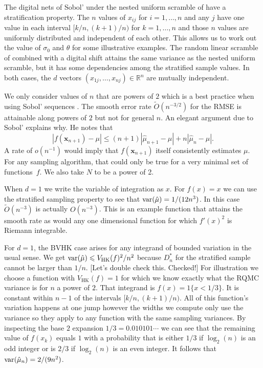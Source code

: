 \documentclass{article}
\newcommand{\art}[1]{\begingroup\color{blue}#1\endgroup}
\renewcommand{\le}{\leqslant}
\newcommand{\real}{\mathbb{R}}
\newcommand{\bsx}{\boldsymbol{x}}
\newcommand{\hk}{\mathrm{HK}}
\begin{document}
The digital nets of Sobol' \cite{Sob67} under the nested
uniform scramble of \cite{Owe95} have a stratification
property.  The $n$ values of $x_{ij}$ for $i=1,\dots,n$
and any $j$ have one value in each interval $[k/n,(k+1)/n)$
for $k=1,\dots,n$ and those $n$ values are uniformly distributed
and independent of each other. This allows us to work out
the value of $\sigma_0$ and $\theta$ for some illustrative
examples.  The random linear scramble of \cite{Mat98} combined
with a digital shift attains the same variance as the nested
uniform scramble, but it has some dependencies among the stratified
sample values.  In both cases, the $d$ vectors $(x_{1j},
\dots,x_{nj})\in\real^n$ are mutually independent.

We only consider values of $n$ that are powers of $2$
which is a best practice when using Sobol' sequences \cite{Owe22a}.
The smooth error rate $\tilde O(n^{-3/2})$ for the RMSE
is attainable along powers of $2$
but not for general $n$. An elegant argument due
to Sobol' \cite{sobo:1998} explains why.
He notes that
$$
|f(\bsx_{n+1})-\mu|
\le (n+1)|\hat\mu_{n+1}-\mu|+n|\hat\mu_n-\mu|.
$$
A rate of $o(n^{-1})$ would imply that $f(\bsx_{n+1})$ itself
consistently estimates $\mu$. For any sampling
algorithm, that could only be true for a very minimal 
set of functions~$f$.
We also take $N$ to be a power of 2.

When $d=1$ we write the variable of integration as $x$.
For $f(x)=x$ we can use the stratified sampling property
to see that $\operatorname{var}(\hat\mu) = 1/(12n^3)$.
In this case $\tilde O(n^{-3})$ is actually $O(n^{-3})$.
This is an example function that attains the smooth
rate as would any one dimensional function for
which $f'(x)^2$ is Riemann integrable.

For $d=1$, the BVHK case arises for any integrand
of bounded variation in the usual sense.
We get $\var(\hat\mu)\le V_{\hk}(f)^2/n^2$
because $D_n^*$ for the stratified sample
cannot be larger than $1/n$. \art{[Let's double check this. Checked!]}
For illustration we choose a function with $V_{\hk}(f)=1$
for which we know exactly what the RQMC variance is
for $n$ a power of $2$.
That integrand is $f(x)=1\{x<1/3\}$.
It is constant within $n-1$ of the intervals $[k/n,(k+1)/n)$.
All of this function's variation happens at one jump
however the widths we compute only use the variance
so they apply to any function with the same sampling variances.
By inspecting the base $2$ expansion $1/3=0.010101\cdots$
we can see that the remaining value of $f(x_k)$ equals
$1$ with a probability that is either $1/3$ if $\log_2(n)$
is an odd integer or is $2/3$ if $\log_2(n)$ is an
even integer. It follows that
$\operatorname{var}(\hat\mu_n)=2/(9n^2)$.
\end{document}
